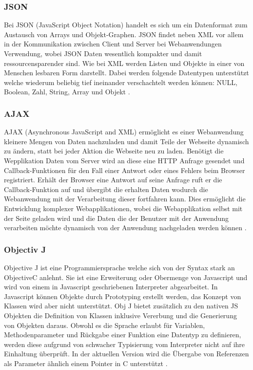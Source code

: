 \subsubsection{JSON}
\label{sec:JSON}
Bei JSON (JavaScript Object Notation) handelt es sich um ein Datenformat zum Austausch von Arrays und Objekt-Graphen.
JSON findet neben XML vor allem in der Kommunikation zwischen Client und Server bei Webanwendungen Verwendung, 
wobei JSON Daten wesentlich kompakter und damit ressourcensparender sind.
Wie bei XML werden Listen und Objekte in einer von Menschen lesbaren Form darstellt.
Dabei werden folgende Datentypen unterstützt\R{,} welche wiederum beliebig tief ineinander verschachtelt werden können: NULL, Boolean, Zahl, String, Array und Objekt \cite{ajax}.

\subsubsection{AJAX}
\label{sec:AJAX}
AJAX (Asynchronous JavaScript and XML) ermöglicht es einer Webanwendung\R{,} kleinere Mengen von Daten nachzuladen und damit Teile der Webseite dynamisch zu ändern, 
statt bei jeder Aktion die Webseite neu zu laden.
Benötigt die Wepplikation Daten vom Server\R{,} wird an diese eine HTTP Anfrage gesendet und Callback-Funktionen für den Fall einer Antwort oder eines Fehlers beim Browser registriert.
Erhält der Browser eine Antwort auf seine Anfrage ruft er die Callback-Funktion auf und übergibt die erhalten Daten\R{,} wodurch die Webanwendung mit der Verarbeitung dieser fortfahren kann.
Dies ermöglicht die Entwicklung komplexer Webapplikationen, 
wobei die Webapplikation selbst mit der Seite geladen wird und die Daten\R{,} die der Benutzer mit der Anwendung verarbeiten möchte\R{,} dynamisch von der Anwendung nachgeladen werden können \cite{ajax}.

\subsubsection{Objectiv J}
\label{sec:Objectiv J}

Objective J ist eine Programmiersprache welche sich von der Syntax stark an Objective\R{-}C anlehnt.
Sie ist eine Erweiterung oder Obermenge von Javascript und wird von einem in Javascript geschriebenen Interpreter abgearbeitet.
In Javascript können Objekte durch Prototyping erstellt werden, das Konzept von Klassen wird aber nicht unterstützt.
Obj J bietet zusätzlich zu den nativen JS Objekten die Definition von Klassen inklusive Vererbung und die Generierung von Objekten daraus.
Obwohl es die Sprache erlaubt für Variablen, Methodenparameter und Rückgabe einer Funktion eine Datentyp zu definieren, 
werden diese aufgrund von schwacher Typisierung vom Interpreter nicht auf ihre Einhaltung überprüft.
In der aktuellen Version wird die Übergabe von Referenzen als Parameter ähnlich einem Pointer in C unterstützt \cite{capp}.

